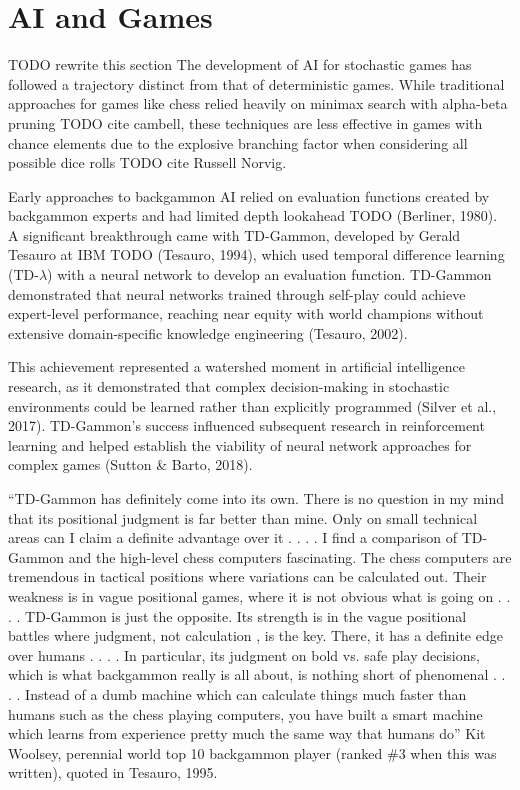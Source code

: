 \section{AI and Games}
TODO rewrite this section
The development of AI for stochastic games has followed a trajectory distinct from that of deterministic games. 
While traditional approaches for games like chess relied heavily on minimax search with alpha-beta pruning TODO cite cambell, these techniques are less effective in games with chance elements due to the explosive branching factor when considering all possible dice rolls TODO cite Russell Norvig.

Early approaches to backgammon AI relied on evaluation functions created by backgammon experts and had limited depth lookahead TODO (Berliner, 1980). A significant breakthrough came with TD-Gammon, developed by Gerald Tesauro at IBM TODO (Tesauro, 1994), which used temporal difference learning (TD-$\lambda$) with a neural network to develop an evaluation function. TD-Gammon demonstrated that neural networks trained through self-play could achieve expert-level performance, reaching near equity with world champions without extensive domain-specific knowledge engineering (Tesauro, 2002).

This achievement represented a watershed moment in artificial intelligence research, as it demonstrated that complex decision-making in stochastic environments could be learned rather than explicitly programmed (Silver et al., 2017). TD-Gammon's success influenced subsequent research in reinforcement learning and helped establish the viability of neural network approaches for complex games (Sutton \& Barto, 2018).

“TD-Gammon has definitely come into its own. There is no question in my mind that its positional judgment is far better than mine.
Only on small technical areas can I claim a definite advantage over
it . . . . I find a comparison of TD-Gammon and the high-level chess
computers fascinating. The chess computers are tremendous in
tactical positions where variations can be calculated out. Their
weakness is in vague positional games, where it is not obvious
what is going on . . . . TD-Gammon is just the opposite. Its strength
is in the vague positional battles where judgment, not calculation ,
is the key. There, it has a definite edge over humans . . . . In particular, its judgment on bold vs. safe play decisions, which is what
backgammon really is all about, is nothing short of phenomenal . . . .
Instead of a dumb machine which can calculate things much faster
than humans such as the chess playing computers, you have built
a smart machine which learns from experience pretty much the
same way that humans do”
Kit Woolsey, perennial world top 10 backgammon player (ranked \#3 when
this was written), quoted in Tesauro, 1995.







